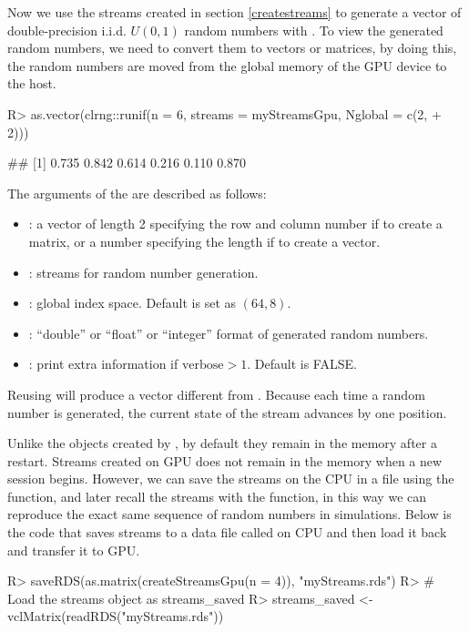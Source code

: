 \documentclass[article,nojss]{jss}\usepackage[]{graphicx}\usepackage[]{color}
\newcommand{\fct}[1]{\code{#1()}}
\begin{document}
Now we use the streams created in section \ref{createstreams} to generate a vector of double-precision i.i.d. $U(0,1)$ random numbers with \fct{clrng::runif}. To view the generated random numbers, we need to convert them to  vectors or matrices, by doing this, the random numbers are moved from the global memory of the GPU device to the host.
\begin{CodeChunk}
\begin{CodeInput}
R> as.vector(clrng::runif(n = 6, streams = myStreamsGpu, Nglobal = c(2,
+    2)))
\end{CodeInput}
\begin{CodeOutput}
## [1] 0.735 0.842 0.614 0.216 0.110 0.870
\end{CodeOutput} 
\end{CodeChunk} 

The arguments of the \fct{clrng::runif} are described as follows:
\begin{itemize}
\itemsep0em 
  \item {}: a vector of length 2 specifying the row and column number if to create a matrix, or a number specifying the length if to create a vector.
  \item {}: streams for random number generation.
  \item {}: global index space. Default is set as $(64,8)$.
  \item {}: ``double'' or ``float'' or ``integer'' format of generated random numbers.
  \item {}: print extra information if $\text{verbose} > 1$. Default is FALSE.
\end{itemize}
Reusing  will produce a vector different from . Because each time a random number is generated, the current state of the stream advances by one position. %

Unlike the objects created by , by default they remain in the memory after a restart. Streams created on GPU does not remain in the memory when a new  session begins. However, we can save the streams on the CPU in a file using the \fct{saveRDS} function, and later recall the streams with the \fct{readRDS} function, in this way we can reproduce the exact same sequence of random numbers in simulations. Below is the code that saves streams to a data file called  on CPU and then load it back and transfer it to GPU.
\begin{CodeChunk}
\begin{CodeInput}
R> saveRDS(as.matrix(createStreamsGpu(n = 4)), "myStreams.rds")
R> # Load the streams object as streams_saved
R> streams_saved <- vclMatrix(readRDS("myStreams.rds"))
\end{CodeInput} 
\end{CodeChunk} 
\end{document}
